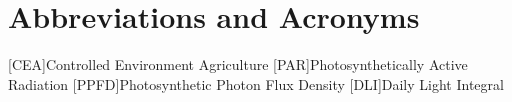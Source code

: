 \chapter{Abbreviations and Acronyms}
%
%
\begin{acronym}%
	[CEA]{Controlled Environment Agriculture}
	[PAR]{Photosynthetically Active Radiation}
	[PPFD]{Photosynthetic Photon Flux Density}
	[DLI]{Daily Light Integral}
\end{acronym}
